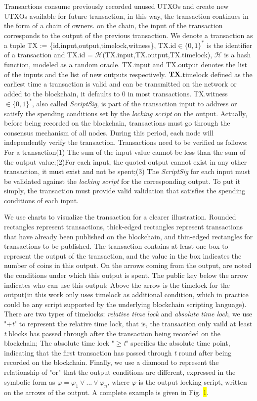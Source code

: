 \documentclass[conference]{IEEEtran}
\begin{document}
 Transactions consume previously recorded unused UTXOs and create new UTXOs available for future transaction, in this way, the 
 transaction continues in the form of a chain of owners. on the chain, the input of the transaction corresponds to the output 
 of the previous transaction. We denote a transaction as a tuple TX := \{id,input,output,timelock,witness\}, TX.id$\in\{0,1\}^*$
 is the identifier of a transaction and TX.id = $\mathcal H$(TX.input,TX.output,TX.timelock), $\mathcal H$ is a hash function,
 modeled as a random oracle. TX.input and TX.output denotes the list of the inputs and the list of new outputs respectively.
 $\bf TX$.timelock defined as the earliest time a transaction is valid and can be transmitted on the network or added to the blockchain, 
 it defaults to 0 in most transactions. TX.witness$\in\{0,1\}^*$, also called \emph{ScriptSig}, is part of the transaction input to address or satisfy the spending 
 conditions set by the \emph{locking script} on the output. Actually, before being recorded on the blockchain, transactions must go
 through the consensus mechanism of all nodes. During this period, each node will independently verify the transaction. Transactions need to be verified as follows: 
 For a transaction(1) The sum of the input value cannot be less 
 than the sum of the output value;(2)For each input, the quoted output cannot exist in any other transaction, it must exist and not 
 be spent;(3) The \emph{ScriptSig} for each input must be validated against the \emph{locking script} for the corresponding output.
 To put it simply, the transaction must provide valid validation that satisfies the spending conditions of each input.

 We use charts to visualize the transaction for a clearer illustration. Rounded rectangles represent transactions, thick-edged rectangles 
 represent transactions that have already been published on the blockchain, and thin-edged rectangles for transactions to be published.
 The transaction contains at least one box to represent the output of the transaction, and the value in the box indicates the number of 
 coins in this output. On the arrows coming from the output, are noted the conditions under which this output is spent. The public key 
 below the arrow indicates who can use this output; Above the arrow is the timelock for the output(in this work only uses timelock 
 as additional condition, which in practice could be any script supported by the underlying blockchain scripting language). There are 
 two types of timelocks: \emph{relative time lock} and \emph{absolute time lock}, we use "+\emph{t}" to represent the relative time lock, 
 that is, the transaction only vaild at least \emph{t} blocks has passed through after the transaction being recorded on the blockchain; 
 The absolute time lock "$\geq$\emph{t}" specifies the absolute time point, indicating that the first transaction has passed through \emph{t} 
 round after being recorded on the blockchain. Finally, we use a diamond to represent the relationship of "or" that the output conditions are 
 different, expressed in the symbolic form as $\varphi = \varphi_1 \vee ...\vee \varphi_n$, where $\varphi$ is the output locking script,
 written on the arrows of the output. A complete example is given in Fig. \colorbox{yellow}{1}.
\end{document}
